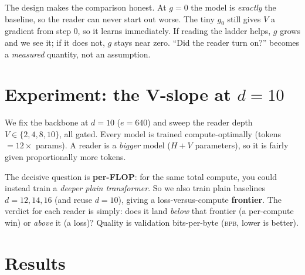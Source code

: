 \documentclass[11pt]{article}
\newcommand{\bpb}{\textsc{bpb}}
\begin{document}
The design makes the comparison honest. At $g{=}0$ the model is \emph{exactly} the baseline, so the
reader can never start out worse. The tiny $g_0$ still gives $V$ a gradient from step $0$, so it
learns immediately. If reading the ladder helps, $g$ grows and we see it; if it does not, $g$ stays
near zero. ``Did the reader turn on?'' becomes a \emph{measured} quantity, not an assumption.

\section{Experiment: the V-slope at $d{=}10$}

We fix the backbone at $d{=}10$ ($e{=}640$) and sweep the reader depth
$V \in \{2,4,8,10\}$, all gated. Every model is trained compute-optimally (tokens $= 12\times$ params).
A reader is a \emph{bigger} model ($H{+}V$ parameters), so it is fairly given proportionally more
tokens.

The decisive question is \textbf{per-FLOP}: for the same total compute, you could instead train a
\emph{deeper plain transformer}. So we also train plain baselines $d{=}12,14,16$ (and reuse $d{=}10$),
giving a loss-versus-compute \textbf{frontier}. The verdict for each reader is simply: does it land
\emph{below} that frontier (a per-compute win) or \emph{above} it (a loss)? Quality is validation
bits-per-byte (\bpb, lower is better).

\section{Results}
\end{document}
